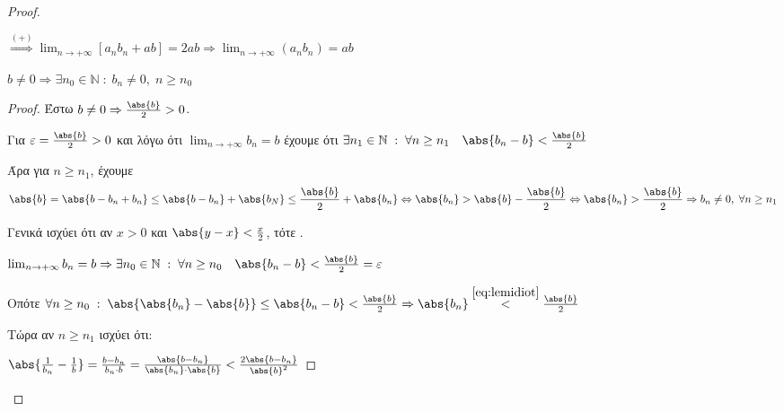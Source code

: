 \documentclass[main.tex]{subfiles}
\begin{document}
\begin{proof}
\begin{enumerate}[i)]
\begin{description}
  $ \overset{(+)}{\Rightarrow} \lim_{n \to +\infty} [a_{n} b_{n} + ab] = 2ab \Rightarrow 
  \lim_{n \to +\infty} (a_{n}b_{n}) = ab $
 \end{description}

 \item \begin{lem}
         $ b \neq 0 \Rightarrow \exists n_{0} \in \mathbb{N} \; : \; b_{n} \neq 0, \; n \geq n_{0} $ 
     \end{lem}

    \begin{proof}
    \item {}
        Έστω $ b \neq 0 \Rightarrow \frac{\abs{b}}{2} >0 $. 
        
        Για $ \varepsilon = \frac{\abs{b}}{2} >0 $ και λόγω ότι $ \lim_{n \to +\infty} b_{n} = b $
        έχουμε ότι $ \exists n_{1} \in \mathbb{N} \; : \; \forall n \geq n_{1} \quad \abs{b_{n}-b} 
        < \frac{\abs{b}}{2} $

        Άρα για $ n \geq n_{1} $, έχουμε 
        \[
            \abs{b} = \abs{b - b_{n} + b_{n}} \leq \abs{b - b_{n}} + \abs{b_{N}} \leq
            \frac{\abs{b}}{2} + \abs{b_{n}} \Leftrightarrow \abs{b_{n}} > \abs{b} -
            \frac{\abs{b}}{2} \Leftrightarrow \abs{b_{n}}  > \frac{\abs{b}}{2} \Rightarrow b_{n} 
            \neq 0, \; \forall n \geq n_{1}
        \] 

        \begin{description}
            \item [Β᾽ Τρόπος:] 
            \item {}
                Γενικά ισχύει ότι αν $ x >0 $ και $ \abs{y-x} < \frac{x}{2} $, 
                τότε .
                
                $ \lim_{n \to +\infty} b_{n} =b \Rightarrow \exists n_{0} \in \mathbb{N} \; : \; 
                \forall n \geq n_{0} \quad \abs{b_{n}-b} < \frac{\abs{b}}{2} = \varepsilon $

                Οπότε $ \forall n \geq n_{0} \; : \; \abs{\abs{b_{n}} - \abs{b}} \leq \abs{b_{n}-b}
                < \frac{\abs{b}}{2} \Rightarrow \abs{b_{n}} \overset{\eqref{eq:lemidiot}}{<} 
                \frac{\abs{b}}{2}   $ 
        \end{description}

        Τώρα αν $ n \geq n_{1} $ ισχύει ότι:

        $ \abs{\frac{1}{b_{n}} - \frac{1}{b}} = \frac{b-b_{n}}{b_{n}\cdot b} = \frac{\abs{b-b_{n}}
        }{\abs{b_{n}} \cdot \abs{b}} < \frac{2 \abs{b - b_{n}}}{\abs{b}^{2}} $


\end{proof}
\end{enumerate}
\end{proof}
\end{document}
